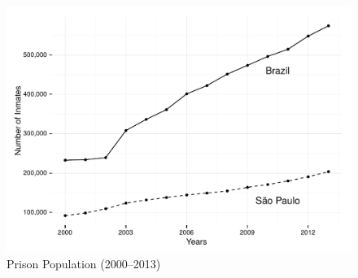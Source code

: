 \begin{center}
\begin{figure}[bth]
\includegraphics[height = 8cm, width = 1\linewidth]{gfx/fig2}
\caption[Prison Population (2000--2013)]{Prison Population (2000--2013)\footnotemark}
\label{fig:fig2}
\end{figure}
\end{center}

